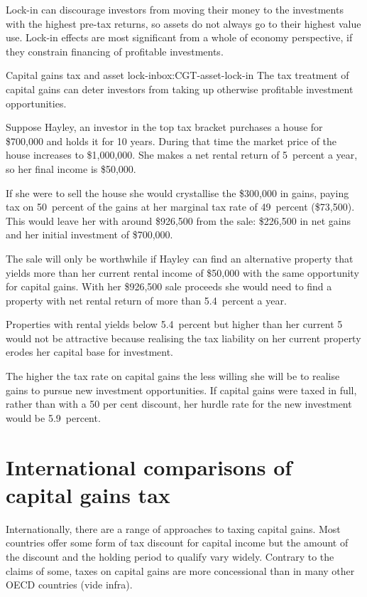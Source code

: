 \documentclass{grattan}\usepackage[]{graphicx}\usepackage[]{color}
\begin{document}
Lock-in can discourage investors from moving their money to the investments with the highest pre-tax returns, so assets do not always go to their highest value use.  Lock-in effects are most significant from a whole of economy perspective, if they constrain financing of profitable investments.  

\begin{smallbox}[!htbp]{Capital gains tax and asset lock-in}{box:CGT-asset-lock-in}
The tax treatment of capital gains can deter investors from taking up otherwise profitable investment opportunities. 



Suppose Hayley, an investor in the top tax bracket purchases a house for \$700,000 and holds it for 10 years. During that time the market price of the house increases to \$1,000,000. She makes a net rental return of 5~percent a year, so her  final income is \$50,000. 

If she were to sell the house she would crystallise the \$300,000 in gains, paying tax on 50~percent of the gains at her marginal tax rate of 49~percent (\$73,500). This would leave her with around \$926,500 from the sale: \$226,500 in net gains and her initial investment of \$700,000. 

The sale will only be worthwhile if Hayley can find an alternative property that yields more than her current rental income of \$50,000  with the same opportunity for capital gains. With her \$926,500 sale proceeds she would need to find a property with net rental return of more than 5.4~percent a year. 

Properties with rental yields below 5.4~percent but higher than her current 5 would not be attractive because realising the tax liability on her current property erodes her capital base for investment.  

The higher the tax rate on capital gains the less willing she will be to realise gains to pursue new investment opportunities. If capital gains were taxed in full, rather than with a 50 per cent discount, her hurdle rate for the new investment would be 5.9~percent.
\end{smallbox}

\onecolumn
\chapter{International comparisons of capital gains tax}
Internationally, there are a range of approaches to taxing capital gains. Most countries offer some form of tax discount for capital income but the amount of the discount and the holding period to qualify vary widely. Contrary to the claims of some, taxes on capital gains are more concessional than in many other OECD countries (vide infra).
\end{document}
